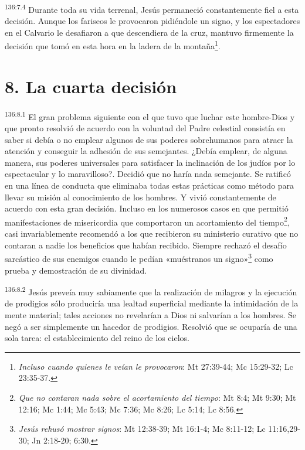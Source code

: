 \par 
\textsuperscript{136:7.4} Durante toda su vida terrenal, Jesús permaneció constantemente fiel a esta decisión. Aunque los fariseos le provocaron pidiéndole un signo, y los espectadores en el Calvario le desafiaron a que descendiera de la cruz, mantuvo firmemente la decisión que tomó en esta hora en la ladera de la montaña\footnote{\textit{Incluso cuando quienes le veían le provocaron}: Mt 27:39-44; Mc 15:29-32; Lc 23:35-37.}.

\section*{8. La cuarta decisión}
\par 
\textsuperscript{136:8.1} El gran problema siguiente con el que tuvo que luchar este hombre-Dios y que pronto resolvió de acuerdo con la voluntad del Padre celestial consistía en saber si debía o no emplear algunos de sus poderes sobrehumanos para atraer la atención y conseguir la adhesión de sus semejantes. ¿Debía emplear, de alguna manera, sus poderes universales para satisfacer la inclinación de los judíos por lo espectacular y lo maravilloso?. Decidió que no haría nada semejante. Se ratificó en una línea de conducta que eliminaba todas estas prácticas como método para llevar su misión al conocimiento de los hombres. Y vivió constantemente de acuerdo con esta gran decisión. Incluso en los numerosos casos en que permitió manifestaciones de misericordia que comportaron un acortamiento del tiempo\footnote{\textit{Que no contaran nada sobre el acortamiento del tiempo}: Mt 8:4; Mt 9:30; Mt 12:16; Mc 1:44; Mc 5:43; Mc 7:36; Mc 8:26; Lc 5:14; Lc 8:56.}, casi invariablemente recomendó a los que recibieron su ministerio curativo que no contaran a nadie los beneficios que habían recibido. Siempre rechazó el desafío sarcástico de sus enemigos cuando le pedían «muéstranos un signo»\footnote{\textit{Jesús rehusó mostrar signos}: Mt 12:38-39; Mt 16:1-4; Mc 8:11-12; Lc 11:16,29-30; Jn 2:18-20; 6:30.} como prueba y demostración de su divinidad.

\par 
\textsuperscript{136:8.2} Jesús preveía muy sabiamente que la realización de milagros y la ejecución de prodigios sólo produciría una lealtad superficial mediante la intimidación de la mente material; tales acciones no revelarían a Dios ni salvarían a los hombres. Se negó a ser simplemente un hacedor de prodigios. Resolvió que se ocuparía de una sola tarea: el establecimiento del reino de los cielos.

